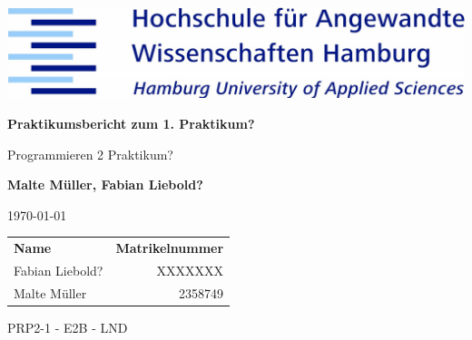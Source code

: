 \documentclass[12pt]{scrreprt}
\begin{document}
\parindent 0pt %

\begin{titlepage}
	
	\centering
	\begin{figure}
		\vspace*{0cm}	
	\end{figure}
	
	\includegraphics[width=14cm]{img/haw_logo.jpg}\par
	\vspace{3cm}
	
	{\huge\bfseries Praktikumsbericht zum 1. Praktikum?\par}

	\vspace{0.5cm}

	{\LARGE Programmieren 2 Praktikum?\par}
	
	\vspace{1.5cm}
	
	{\Large \bfseries Malte Müller, Fabian Liebold?\par}
	
	\vspace{1.5cm}

	{\large \today\par}

	\vspace{5cm}

	\begin{tabular}{lr}
		\rule[-1ex]{0pt}{2.5ex} \textbf{Name} \hspace{2cm} & \textbf{Matrikelnummer }\\  
		\rule[-1ex]{0pt}{2.5ex} Fabian Liebold? & XXXXXXX \\ 
		\rule[-1ex]{0pt}{2.5ex} Malte Müller  & 2358749 \\ 	
	\end{tabular} 
	\vfill
	{PRP2-1 - E2B - LND} 
	

		
	
\end{titlepage}
\thispagestyle{fancy}
\thispagestyle{fancy}






\end{document}
